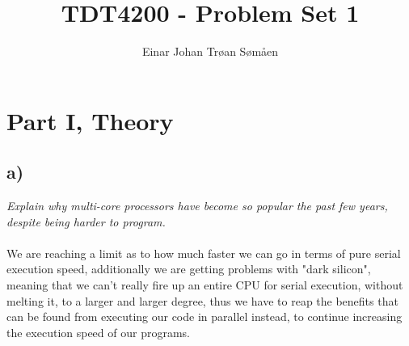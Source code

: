 \documentclass[a4paper]{article}
\title{TDT4200 - Problem Set 1}
\author{Einar Johan Trøan Sømåen}
\begin{document}
\maketitle

\section{Part I, Theory}
\subsection*{a)} \textit{Explain why multi-core processors have become so popular the past few years, despite being harder
to program.}
\\\\
We are reaching a limit as to how much faster we can go in terms of pure serial execution speed, additionally we are getting problems with "dark silicon", meaning that we can't really fire up an entire CPU for serial execution, without melting it, to a larger and larger degree, thus we have to reap the benefits that can be found from executing our code in parallel instead, to continue increasing the execution speed of our programs.
\end{document}
